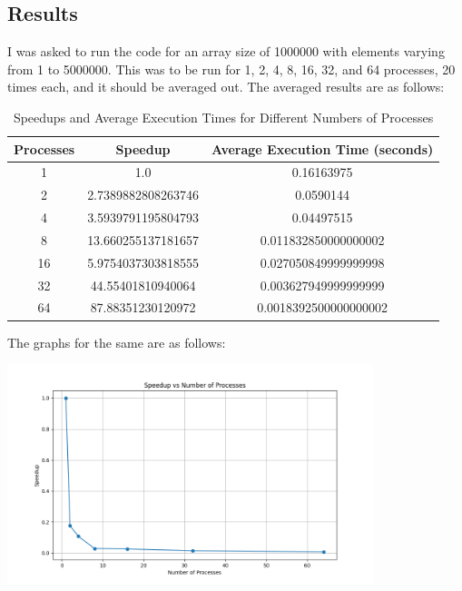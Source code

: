 \documentclass[12pt]{article}
\begin{document}
\subsection*{Results}
I was asked to run the code for an array size of 1000000 with elements varying from 1 to 5000000. This was to be run for 1, 2, 4, 8, 16, 32, and 64 processes, 20 times each, and it should be averaged out. The averaged results are as follows:
\begin{table}[h!]
    \centering
    \begin{tabular}{|c|c|c|}
    \hline
    \textbf{Processes} & \textbf{Speedup} & \textbf{Average Execution Time (seconds)} \\ \hline
    1  & 1.0                        & 0.16163975 \\ \hline
    2  & 2.7389882808263746         & 0.0590144 \\ \hline
    4  & 3.5939791195804793         & 0.04497515 \\ \hline
    8  & 13.660255137181657         & 0.011832850000000002 \\ \hline
    16 & 5.9754037303818555         & 0.027050849999999998 \\ \hline
    32 & 44.55401810940064          & 0.003627949999999999 \\ \hline
    64 & 87.88351230120972          & 0.0018392500000000002 \\ \hline
    \end{tabular}
    \caption{Speedups and Average Execution Times for Different Numbers of Processes}
    \label{table:speedups_execution_times}
\end{table}
The graphs for the same are as follows:
\begin{center}
    \includegraphics[width=0.8\textwidth]{speedup_vs_processes.png}
    \label{fig:speedup_processes}
\end{center}
\end{document}
